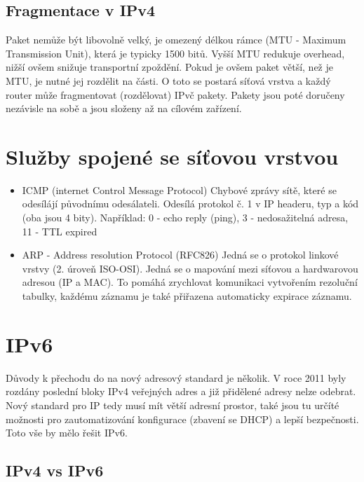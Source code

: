 \documentclass{szzclass}
\begin{document}
\subsection{Fragmentace v IPv4}

Paket nemůže být libovolně velký, je omezený délkou rámce (MTU - Maximum Transmission Unit), která je typicky 1500 bitů. Vyšší MTU redukuje overhead, nižší ovšem
snižuje transportní zpoždění. Pokud je ovšem paket větší, než je MTU, je nutné jej rozdělit na části. O toto se postará síťová vrstva a každý router může fragmentovat (rozdělovat)
IPvč pakety. Pakety jsou poté doručeny nezávisle na sobě a jsou složeny až na cílovém zařízení.

\section{Služby spojené se síťovou vrstvou}

\begin{itemize}
    \item ICMP (internet Control Message Protocol)
          Chybové zprávy sítě, které se odesílájí původnímu odesálateli. Odesílá protokol č. 1 v IP headeru, typ a kód (oba jsou 4 bity).
          Například: 0 - echo reply (ping), 3 - nedosažitelná adresa, 11 - TTL expired
    \item ARP - Address resolution Protocol (RFC826)
          Jedná se o protokol linkové vrstvy (2. úroveň ISO-OSI). Jedná se o mapování mezi síťovou a hardwarovou adresou (IP a MAC). To pomáhá zrychlovat komunikaci vytvořením
          rezoluční tabulky, každému záznamu je také přiřazena automaticky expirace záznamu.
\end{itemize}

\section{IPv6}

Důvody k přechodu do na nový adresový standard je několik. V roce 2011 byly rozdány poslední bloky IPv4 veřejných adres a již přidělené adresy nelze odebrat.
Nový standard pro IP tedy musí mít větší adresní prostor, také jsou tu určíté možnosti pro zautomatizování konfigurace (zbavení se DHCP) a lepší bezpečnosti.
Toto vše by mělo řešit IPv6.

\subsection{IPv4 vs IPv6}
\end{document}
